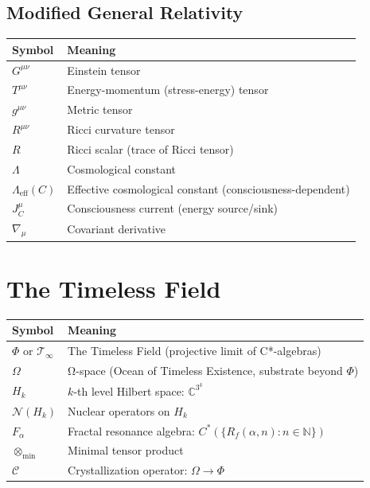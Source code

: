 \subsection*{Modified General Relativity}

\begin{center}
\begin{tabular}{ll}
\toprule
\textbf{Symbol} & \textbf{Meaning} \\
\midrule
$G^{\mu\nu}$ & Einstein tensor \\
$T^{\mu\nu}$ & Energy-momentum (stress-energy) tensor \\
$g^{\mu\nu}$ & Metric tensor \\
$R^{\mu\nu}$ & Ricci curvature tensor \\
$R$ & Ricci scalar (trace of Ricci tensor) \\
$\Lambda$ & Cosmological constant \\
$\Lambda_{\text{eff}}(C)$ & Effective cosmological constant (consciousness-dependent) \\
$J^{\mu}_C$ & Consciousness current (energy source/sink) \\
$\nabla_\mu$ & Covariant derivative \\
\bottomrule
\end{tabular}
\end{center}

\section*{The Timeless Field}

\begin{center}
\begin{tabular}{ll}
\toprule
\textbf{Symbol} & \textbf{Meaning} \\
\midrule
$\Phi$ or $\mathcal{T}_\infty$ & The Timeless Field (projective limit of C*-algebras) \\
$\Omega$ & Ω-space (Ocean of Timeless Existence, substrate beyond $\Phi$) \\
$H_k$ & $k$-th level Hilbert space: $\mathbb{C}^{3^k}$ \\
$\mathcal{N}(H_k)$ & Nuclear operators on $H_k$ \\
$F_\alpha$ & Fractal resonance algebra: $C^*(\{R_f(\alpha, n) : n \in \mathbb{N}\})$ \\
$\otimes_{\min}$ & Minimal tensor product \\
$\mathcal{C}$ & Crystallization operator: $\Omega \to \Phi$ \\
\bottomrule
\end{tabular}
\end{center}

